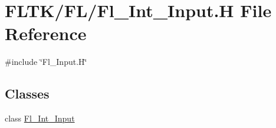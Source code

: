 \hypertarget{_fl___int___input_8_h}{}\section{F\+L\+T\+K/\+F\+L/\+Fl\+\_\+\+Int\+\_\+\+Input.H File Reference}
\label{_fl___int___input_8_h}
{\ttfamily \#include \char`\"{}Fl\+\_\+\+Input.\+H\char`\"{}}\newline
\subsection*{Classes}
\begin{DoxyCompactItemize}
\item 
class \hyperlink{class_fl___int___input}{Fl\+\_\+\+Int\+\_\+\+Input}
\end{DoxyCompactItemize}
